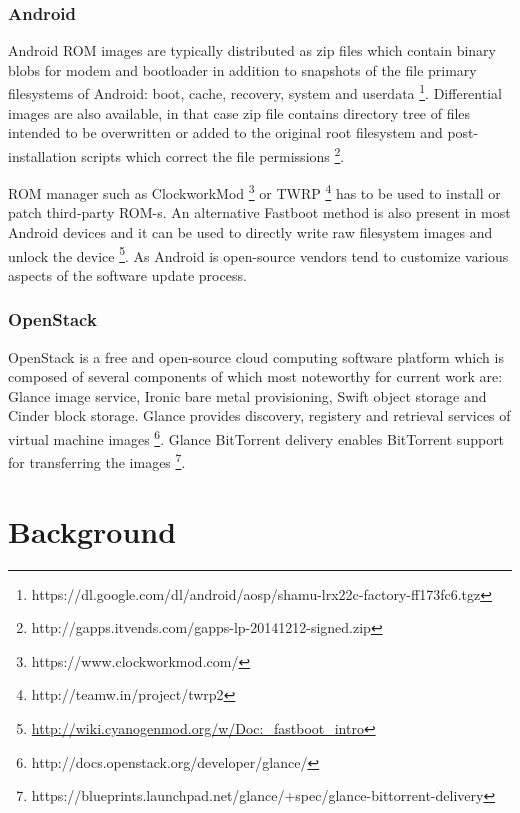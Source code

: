 \documentclass[a4paper,11pt]{kth-mag}
\begin{document}
\cite{building-murphy-compatible-embedded-linux-systems}
\cite{safe-upgrade-of-embedded-systems}
\cite{software-update-scheme-by-airwaves}

\subsection{Android}

Android ROM images are typically distributed as zip files which contain 
binary blobs for modem and bootloader in addition to snapshots of the
file primary filesystems of Android: boot, cache, recovery, system and
userdata
\footnote{https://dl.google.com/dl/android/aosp/shamu-lrx22c-factory-ff173fc6.tgz}.
Differential images are also available, in that case zip file contains
directory tree of files intended to be overwritten or added to the original
root filesystem and post-installation scripts which correct the file permissions
\footnote{http://gapps.itvends.com/gapps-lp-20141212-signed.zip}.

ROM manager such as ClockworkMod \footnote{https://www.clockworkmod.com/} or
TWRP \footnote{http://teamw.in/project/twrp2} has to be used to install or patch
third-party ROM-s.
An alternative Fastboot method is also present in most
Android devices and it can be used to directly write raw filesystem images and
unlock the device
\footnote{\url{http://wiki.cyanogenmod.org/w/Doc:_fastboot_intro}}.
As Android is open-source vendors tend to customize various aspects
of the software update process.




\subsection{OpenStack}

OpenStack is a free and open-source cloud computing software platform
which is composed of several components of which most noteworthy for current work are:
Glance image service, Ironic bare metal provisioning,
Swift object storage and Cinder block storage.
Glance provides discovery, registery and retrieval services of virtual machine images
\footnote{http://docs.openstack.org/developer/glance/}.
Glance BitTorrent delivery enables BitTorrent support for transferring the images
\footnote{https://blueprints.launchpad.net/glance/+spec/glance-bittorrent-delivery}.





%
%
%
%
\chapter{Background}
\label{chap:bgr}
\end{document}
